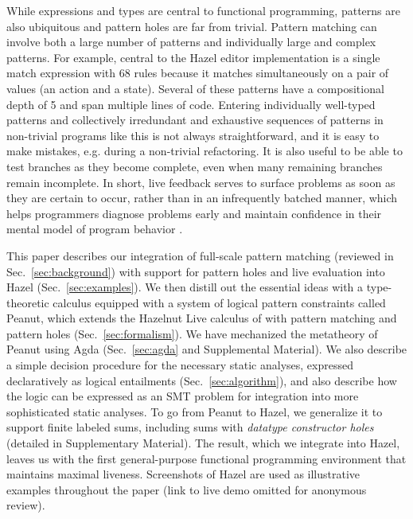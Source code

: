 While expressions and types are central to functional programming, patterns are also ubiquitous and pattern holes are far from trivial. Pattern matching can involve both a large number of patterns and individually large and complex patterns. For example, central to the Hazel editor implementation is a single match expression with 68 rules because it matches simultaneously on a pair of values (an action and a state). Several of these patterns have a compositional depth of 5 and span multiple lines of code. Entering individually well-typed patterns and collectively irredundant and exhaustive sequences of patterns in non-trivial programs like this is not always straightforward, and it is easy to make mistakes, e.g. during a non-trivial refactoring. It is also useful to be able to test branches as they become complete, even when many remaining branches remain incomplete. In short, live feedback serves to surface problems as soon as they are certain to occur, rather than in an infrequently batched manner, which helps programmers diagnose problems early and maintain confidence in their mental model of program behavior \cite{tanimoto2013perspective}.

This paper describes our integration of full-scale pattern matching (reviewed in Sec.~\ref{sec:background}) with support for pattern holes and live evaluation into Hazel (Sec.~\ref{sec:examples}). We then distill out the essential ideas with a type-theoretic calculus equipped with a system of logical pattern constraints called Peanut, which extends the Hazelnut Live calculus of \citet{DBLP:journals/pacmpl/OmarVCH19} with pattern matching and pattern holes (Sec.~\ref{sec:formalism}). We have mechanized the metatheory of Peanut using Agda (Sec.~\ref{sec:agda} and Supplemental Material). We also describe a simple decision procedure for the necessary static analyses, expressed declaratively as logical entailments (Sec.~\ref{sec:algorithm}), and also describe how the logic can be expressed as an SMT problem for integration into more sophisticated static analyses. To go from Peanut to Hazel, we generalize it to support finite labeled sums, including sums with \emph{datatype constructor holes} (detailed in Supplementary Material). The result, which we integrate into Hazel, leaves us with the first general-purpose functional programming environment that maintains maximal liveness. Screenshots of Hazel are used as illustrative examples throughout the paper (link to live demo omitted for anonymous review).

